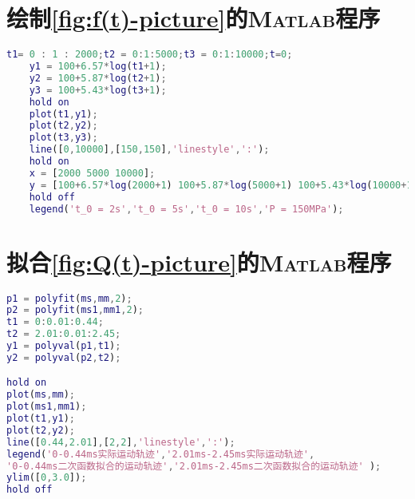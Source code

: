 \documentclass{cumcmthesis}
\begin{document}
\begin{appendices}
\section{绘制\cref{fig:f(t)-picture}的\textsc{Matlab}程序}
\begin{lstlisting}[language=matlab]
	t1= 0 : 1 : 2000;t2 = 0:1:5000;t3 = 0:1:10000;t=0;
	y1 = 100+6.57*log(t1+1);
	y2 = 100+5.87*log(t2+1);
	y3 = 100+5.43*log(t3+1);
	hold on
	plot(t1,y1);
	plot(t2,y2);
	plot(t3,y3);
	line([0,10000],[150,150],'linestyle',':');
	hold on
	x = [2000 5000 10000];
	y = [100+6.57*log(2000+1) 100+5.87*log(5000+1) 100+5.43*log(10000+1)];
	hold off
	legend('t_0 = 2s','t_0 = 5s','t_0 = 10s','P = 150MPa');
\end{lstlisting}

\section{拟合\cref{fig:Q(t)-picture}的\textsc{Matlab}程序}
\begin{lstlisting}[language=matlab]
p1 = polyfit(ms,mm,2);
p2 = polyfit(ms1,mm1,2);
t1 = 0:0.01:0.44;
t2 = 2.01:0.01:2.45;
y1 = polyval(p1,t1);
y2 = polyval(p2,t2);

hold on
plot(ms,mm);
plot(ms1,mm1);
plot(t1,y1);
plot(t2,y2);
line([0.44,2.01],[2,2],'linestyle',':');
legend('0-0.44ms实际运动轨迹','2.01ms-2.45ms实际运动轨迹',
'0-0.44ms二次函数拟合的运动轨迹','2.01ms-2.45ms二次函数拟合的运动轨迹' );
ylim([0,3.0]);
hold off
\end{lstlisting}

\end{appendices}
\end{document}
